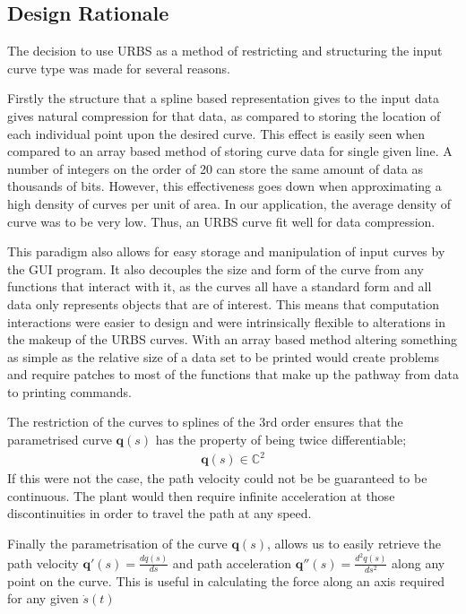 \subsection{Design Rationale}

The decision to use URBS as a method of restricting and structuring the input curve type was made for several reasons. 

Firstly the structure that a spline based representation gives to the input data gives natural compression for that data, as compared to storing the location of each individual point upon the desired curve. This effect is easily seen when compared to an array based method of storing curve data for single given line. A number of integers on the order of 20 can store the same amount of data as thousands of bits. However, this effectiveness goes down when approximating a high density of curves per unit of area. In our application, the average density of curve was to be very low. Thus, an URBS curve fit well for data compression. 

This paradigm also allows for easy storage and manipulation of input curves by the GUI program. It also decouples the size and form of the curve from any functions that interact with it, as the curves all have a standard form and all data only represents objects that are of interest. This means that computation interactions were easier to design and were intrinsically flexible to alterations in the makeup of the URBS curves. With an array based method altering something as simple as the relative size of a data set to be printed would create problems and require patches to most of the functions that make up the pathway from data to printing commands.

The restriction of the curves to splines of the 3rd order ensures that the parametrised curve $\textbf{q}(s)$ has the property of being twice differentiable;
\begin{align*}
\textbf{q}(s) \in \mathbb{C}^2
\end{align*}
If this were not the case, the path velocity could not be be guaranteed to be continuous. The plant would then require infinite acceleration at those discontinuities in order to travel the path at any speed. 

Finally the parametrisation of the curve $\textbf{q}(s)$, allows us to easily retrieve the path velocity $\textbf{q}'(s) = \frac{dq(s)}{ds}$ and path acceleration $\textbf{q}''(s) =  \frac{d^2q(s)}{ds^2}$ along any point on the curve. This is useful in calculating the force along an axis required for any given $\dot{s}(t)$

